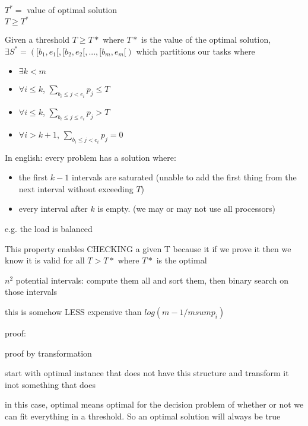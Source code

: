 \documentclass[landscape]{slides}
\begin{document}
\begin{slide}
  $T^* = $ value of optimal solution
  \\$T \geq T^*$
\end{slide}

\begin{slide}
  Given a threshold $T \geq T*$ where $T*$ is the value of the optimal
  solution, $\exists S^* = ([b_1,e_1[, [b_2,e_2[, ... , [b_m,e_m[)$ which
  partitions our tasks where 
  \begin{itemize}
    \item $\exists k < m$
    \item $\forall i \leq k$, $\sum_{b_i \leq j < e_i} p_j \leq T$
    \item $\forall i \leq k$, $\sum_{b_i \leq j \leq e_i} p_j > T$
    \item $\forall i > k + 1$, $\sum_{b_i \leq j < e_i} p_j = 0$
  \end{itemize}
\end{slide}

\begin{slide}
  In english: every problem has a solution where:
  \begin{itemize}
    \item the first $k - 1$ intervals are saturated (unable to add the first
          thing from the next interval without exceeding $T$)
    \item every interval after $k$ is empty. (we may or may not use all 
          processors)
  \end{itemize}
  e.g. the load is balanced
\end{slide}

\begin{slide}
  This property enables CHECKING a given T because it if we prove it then we
  know it is valid for all $T > T*$ where $T*$ is the optimal

  $n^2$ potential intervals: compute them all and sort them, then binary search
  on those intervals
  
  this is somehow LESS expensive than $log(m-1/m sum p_i)$
\end{slide}

\begin{slide}
  proof:

  proof by transformation

  start with optimal instance that does not have this structure and transform
  it inot something that does

  in this case, optimal means optimal for the decision problem of whether or
  not we can fit everything in a threshold. So an optimal solution will always
  be true
\end{slide}
\end{document}
